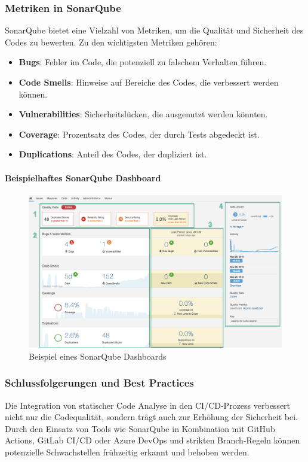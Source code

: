 \subsubsection{Metriken in SonarQube}

SonarQube bietet eine Vielzahl von Metriken, um die Qualität und Sicherheit des Codes zu bewerten. Zu den wichtigsten Metriken gehören:

\begin{itemize}
    \item \textbf{Bugs}: Fehler im Code, die potenziell zu falschem Verhalten führen.
    \item \textbf{Code Smells}: Hinweise auf Bereiche des Codes, die verbessert werden können.
    \item \textbf{Vulnerabilities}: Sicherheitslücken, die ausgenutzt werden könnten.
    \item \textbf{Coverage}: Prozentsatz des Codes, der durch Tests abgedeckt ist.
    \item \textbf{Duplications}: Anteil des Codes, der dupliziert ist.
\end{itemize}

\paragraph{Beispielhaftes SonarQube Dashboard}

\begin{figure}[h!]
\centering
\includegraphics[width=\textwidth]{img/sonarqube_dashboard.png}
\caption{Beispiel eines SonarQube Dashboards}
\label{fig:sonarqube_dashboard}
\end{figure}

\subsubsection{Schlussfolgerungen und Best Practices}

Die Integration von statischer Code Analyse in den CI/CD-Prozess verbessert nicht nur die Codequalität, sondern trägt auch zur Erhöhung der Sicherheit bei. Durch den Einsatz von Tools wie SonarQube in Kombination mit GitHub Actions, GitLab CI/CD oder Azure DevOps und strikten Branch-Regeln können potenzielle Schwachstellen frühzeitig erkannt und behoben werden.

